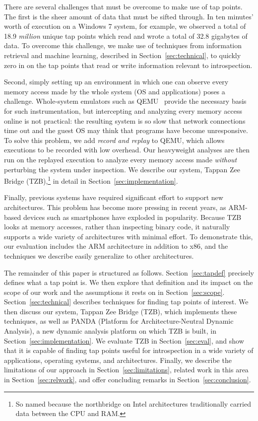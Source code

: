 There are several challenges that must be overcome to make use of tap
points. The first is the sheer amount of data that must be sifted
through. In ten minutes' worth of execution on a Windows 7 system, for
example, we observed a total of 18.9 \emph{million} unique tap points
which read and wrote a total of 32.8 gigabytes of data. To overcome this
challenge, we make use of techniques from information retrieval and
machine learning, described in Section~\ref{sec:technical}, to quickly
zero in on the tap points that read or write information relevant to
introspection.

Second, simply setting up an environment in which one can observe every
memory access made by the whole system (OS and applications) poses a
challenge. Whole-system emulators such as QEMU~\cite{Bellard:2005}
provide the necessary basis for such instrumentation, but intercepting
and analyzing every memory access online is not practical: the resulting
system is so slow that network connections time out and the guest OS may
think that programs have become unresponsive. To solve this problem, we
add \emph{record and replay} to QEMU, which allows executions to be
recorded with low overhead. Our heavyweight analyses are then run on
the replayed execution to analyze every memory access made
\emph{without} perturbing the system under inspection. We describe our
system, Tappan Zee Bridge (TZB),\footnote{So named because the
northbridge on Intel architectures traditionally carried data between
the CPU and RAM.} in detail in Section~\ref{sec:implementation}.

Finally, previous systems have required significant effort
to support new architectures. This problem has become more pressing in
recent years, as ARM-based devices such as smartphones have exploded in
popularity. Because TZB looks at memory accesses, rather than inspecting
binary code, it naturally supports a wide variety of architectures with
minimal effort. To demonstrate this, our evaluation includes the ARM
architecture in addition to x86, and the techniques we describe easily
generalize to other architectures.

The remainder of this paper is structured as follows.
Section~\ref{sec:tapdef} precisely defines what a tap point is. We then
explore that definition and its impact on the scope of our work and the
assumptions it rests on in Section~\ref{sec:scope}.
Section~\ref{sec:technical} describes techniques for finding tap points
of interest. We then discuss our system, Tappan Zee Bridge (TZB), which
implements these techniques, as well as PANDA (Platform for
Architecture-Neutral Dynamic Analysis), a new dynamic analysis platform
on which TZB is built, in Section~\ref{sec:implementation}. We evaluate
TZB in Section~\ref{sec:eval}, and show that it is capable of finding
tap points useful for introspection in a wide variety of applications,
operating systems, and architectures. Finally, we describe the
limitations of our approach in Section~\ref{sec:limitations}, related
work in this area in Section~\ref{sec:relwork}, and offer concluding
remarks in Section~\ref{sec:conclusion}.

\vfill\eject
